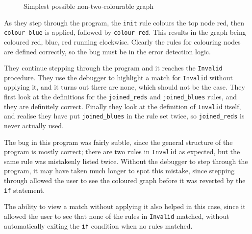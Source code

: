 \documentclass[authoryearcitations]{UoYCSproject}
\newenvironment{nscenter}
    {\parskip=0pt\par\nopagebreak\centering}
    {\par\noindent\ignorespacesafterend}
\begin{document}
\begin{figure}
    \begin{framed}
        \begin{nscenter}
        \end{nscenter}
    \end{framed}
    \caption{Simplest possible non-two-colourable graph}
    \label{fig:SimplestNonTwoColourableGraph}
\end{figure}

As they step through the program, the \texttt{init} rule colours the top node red,
then \texttt{colour\_blue} is applied, followed by \texttt{colour\_red}. This results
in the graph being coloured red, blue, red running clockwise. Clearly the rules
for colouring nodes are defined correctly, so the bug must be in the error
detection logic.

They continue stepping through the program and it reaches the \texttt{Invalid}
procedure. They use the debugger to highlight a match for \texttt{Invalid}
without applying it, and it turns out there are none, which should not be the
case. They first look at the definitions for the \texttt{joined\_reds} and
\texttt{joined\_blues} rules, and they are definitely correct. Finally they look
at the definition of \texttt{Invalid} itself, and realise they have put
\texttt{joined\_blues} in the rule set twice, so \texttt{joined\_reds} is never
actually used.

The bug in this program was fairly subtle, since the general structure of the
program is mostly correct; there are two rules in \texttt{Invalid} as expected,
but the same rule was mistakenly listed twice. Without the debugger to step through
the program, it may have taken much longer to spot this mistake, since stepping
through allowed the user to see the coloured graph before it was reverted by
the \texttt{if} statement.

The ability to view a match without applying it also helped in this case, since
it allowed the user to see that none of the rules in \texttt{Invalid} matched,
without automatically exiting the \texttt{if} condition when no rules matched.
\end{document}
